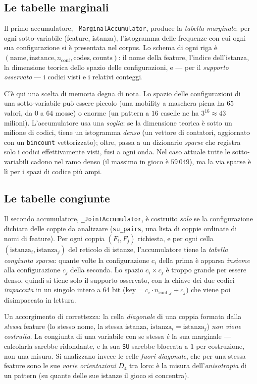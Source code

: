 \subsection{Le tabelle marginali}

Il primo accumulatore, \texttt{\_MarginalAccumulator}, produce la
\emph{tabella marginale}: per ogni sotto-variabile (feature, istanza),
l'istogramma delle frequenze con cui ogni sua configurazione si è presentata
nel corpus. Lo schema di ogni riga è
$(\text{name}, \text{instance}, n_{\text{conf}}, \text{codes},
\text{counts})$: il nome della feature, l'indice dell'istanza, la dimensione
teorica dello spazio delle configurazioni, e — per il \emph{supporto
osservato} — i codici visti e i relativi conteggi.

C'è qui una scelta di memoria degna di nota. Lo spazio delle configurazioni di
una sotto-variabile può essere piccolo (una mobility a maschera piena ha
$65$ valori, da $0$ a $64$ mosse) o enorme (un pattern a $16$ caselle ne ha
$3^{16} \approx 43$ milioni). L'accumulatore usa una \emph{soglia}: se la dimensione teorica
è sotto un milione di codici, tiene un istogramma \emph{denso} (un vettore di
contatori, aggiornato con un \texttt{bincount} vettorizzato); oltre, passa a
un dizionario \emph{sparse} che registra solo i codici effettivamente visti,
fusi a ogni onda. Nel caso attuale tutte le sotto-variabili cadono nel ramo
denso (il massimo in gioco è $59\,049$), ma la via sparse è lì per i spazi di
codice più ampi.

\subsection{Le tabelle congiunte}

Il secondo accumulatore, \texttt{\_JointAccumulator}, è costruito \emph{solo}
se la configurazione dichiara delle coppie da analizzare
(\texttt{su\_pairs}, una lista di coppie ordinate di nomi di feature). Per
ogni coppia $(F_i, F_j)$ richiesta, e per ogni cella
$(\text{istanza}_i, \text{istanza}_j)$ del reticolo di istanze, l'accumulatore
tiene la \emph{tabella congiunta sparsa}: quante volte la configurazione $c_i$
della prima è apparsa \emph{insieme} alla configurazione $c_j$ della seconda.
Lo spazio $c_i \times c_j$ è troppo grande per essere denso, quindi si tiene
solo il supporto osservato, con la chiave dei due codici \emph{impaccata} in
un singolo intero a 64 bit ($\text{key} = c_i \cdot n_{\text{conf},j} + c_j$)
che viene poi disimpaccata in lettura.

Un accorgimento di correttezza: la cella \emph{diagonale} di una coppia
formata dalla \emph{stessa} feature (lo stesso nome, la stessa istanza,
$\text{istanza}_i = \text{istanza}_j$) \emph{non viene costruita}. La
congiunta di una variabile con se stessa \emph{è} la sua marginale —
calcolarla sarebbe ridondante, e la sua \texttt{SU} sarebbe bloccata a $1$
per costruzione, non una misura. Si analizzano invece le celle
\emph{fuori diagonale}, che per una stessa feature sono le sue \emph{varie
orientazioni $D_4$} tra loro: è la misura dell'\emph{anisotropia} di un pattern
(su quante delle sue istanze il gioco si concentra).

